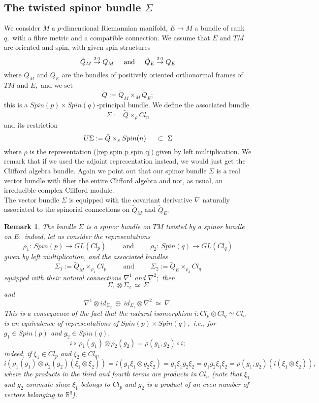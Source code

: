 \documentclass{amsart}
\newtheorem{rem}{Remark}
\begin{document}
\subsection{The twisted spinor bundle $\Sigma$}
We consider $M$ a $p$-dimensional Riemannian manifold, $E\rightarrow M$ a bundle of rank $q,$ with a fibre metric and a compatible connection. We assume that $E$ and $TM$ are oriented and spin, with given spin structures
$$\tilde{Q}_M\stackrel{2:1}{\rightarrow} Q_M\hspace{.5cm}\mbox{and}\hspace{.5cm}\tilde{Q}_E\stackrel{2:1}{\rightarrow} Q_E$$
where $Q_M$ and $Q_E$ are the bundles of positively oriented orthonormal frames of $TM$ and $E,$ and we set
$$\tilde{Q}:=\tilde{Q}_M\times_M \tilde{Q}_E;$$
this is a $Spin(p)\times Spin(q)$-principal bundle. We define the associated bundle 
$$\Sigma:=\tilde{Q}\times_{\rho} Cl_n$$
and its restriction
\begin{equation}\label{def usigma}
U\Sigma:=\tilde{Q}\times_{\rho} Spin(n)\hspace{.5cm}\subset\ \Sigma
\end{equation}
where $\rho$ is the representation (\ref{rep spin p spin q}) given by left multiplication. We remark that if we used the adjoint representation instead, we would just get the Clifford algebra bundle. Again we point out that our spinor bundle $\Sigma$ is a real vector bundle with fiber the entire Clifford algebra and not, as usual, an irreducible complex Clifford module.\\
The vector bundle $\Sigma$ is equipped with the covariant derivative $\nabla$ naturally associated to the spinorial connections on $\tilde{Q}_M$ and $\tilde{Q}_E.$ 
\begin{rem}\label{id sigma tensor product} The bundle $\Sigma$ is a spinor bundle on $TM$ twisted by a spinor bundle on $E:$ indeed, let us consider the representations
$$\rho_1:\ Spin(p)\rightarrow GL(Cl_p)\hspace{1cm}\mbox{and}\hspace{1cm}\rho_2:\ Spin(q)\rightarrow GL(Cl_q)$$
given by left multiplication, and the associated bundles
$$\Sigma_1:=\tilde{Q}_M\times_{\rho_1} Cl_p\hspace{1cm}\mbox{and}\hspace{1cm}\Sigma_2:=\tilde{Q}_E\times_{\rho_2} Cl_q$$
equipped with their natural connections $\nabla^1$ and $\nabla^2;$ then
$$\Sigma_1\otimes\Sigma_2\ \simeq\ \Sigma$$
and
$$\nabla^1\otimes id_{\Sigma_2}\ \oplus\ id_{\Sigma_1}\otimes\nabla^2\ \simeq\ \nabla.$$
This is a consequence of the fact that the natural isomorphism $i:Cl_p\otimes Cl_q\simeq Cl_n$ is an equivalence of representations of $Spin(p)\times Spin(q),$ i.e., for $g_1\in Spin(p)$ and $g_2\in Spin(q),$
$$i \circ\ \rho_1(g_1)\otimes\rho_2(g_2)= \rho(g_1,g_2) \circ i;$$
indeed, if $\xi_1\in Cl_p$ and $\xi_2\in Cl_q,$
$$i(\rho_1(g_1)\otimes\rho_2(g_2) (\xi_1\otimes\xi_2))=i(g_1\xi_1\otimes g_2\xi_2)=g_1\xi_1g_2\xi_2=g_1g_2\xi_1\xi_2=\rho(g_1,g_2)(i(\xi_1\otimes\xi_2)),$$
where the products in the third and fourth terms are products in $Cl_n$ (note that $\xi_1$ and $g_2$ commute since $\xi_1$ belongs to $Cl_p$ and $g_2$ is a product of an even number of vectors belonging to ${\mathbb{R}}^q$).
\end{rem}
\end{document}
